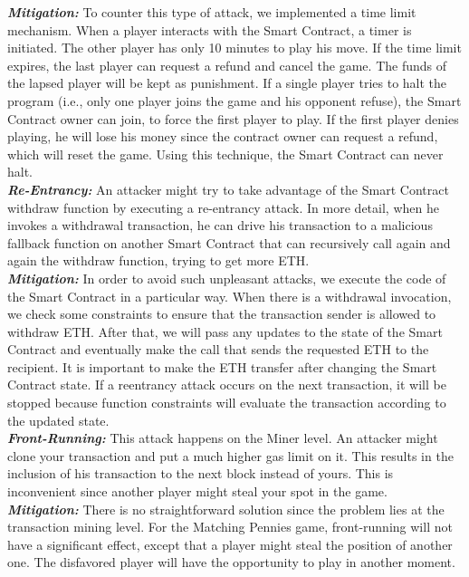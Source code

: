\documentclass[12pt,a4paper]{article}
\begin{document}
\textbf{\emph{Mitigation: }}To counter this type of attack, we implemented a
time limit mechanism. When a player interacts with the Smart Contract, a timer
is initiated. The other player has only 10 minutes to play his move. If the time
limit expires, the last player can request a refund and cancel the game. The
funds of the lapsed player will be kept as punishment. If a single player tries
to halt the program (i.e., only one player joins the game and his opponent
refuse), the Smart Contract owner can join, to force the first player to play.
If the first player denies playing, he will lose his money since the contract
owner can request a refund, which will reset the game. Using this technique, the
Smart Contract can never halt.\\

\textbf{\emph{Re-Entrancy: }}An attacker might try to take advantage of the
Smart Contract withdraw function by executing a re-entrancy attack. In more
detail, when he invokes a withdrawal transaction, he can drive his transaction
to a malicious fallback function on another Smart Contract that can recursively
call again and again the withdraw function, trying to get more ETH.\\

\textbf{\emph{Mitigation: }}In order to avoid such unpleasant attacks, we
execute the code of the Smart Contract in a particular way. When there is a
withdrawal invocation, we check some constraints to ensure that the transaction
sender is allowed to withdraw ETH. After that, we will pass any updates to the
state of the Smart Contract and eventually make the call that sends the
requested ETH to the recipient. It is important to make the ETH transfer after
changing the Smart Contract state. If a reentrancy attack occurs on the next
transaction, it will be stopped because function constraints will evaluate the
transaction according to the updated state.\\

\textbf{\emph{Front-Running: }}This attack happens on the Miner level. An
attacker might clone your transaction and put a much higher gas limit on it.
This results in the inclusion of his transaction to the next block instead of
yours. This is inconvenient since another player might steal your spot in the
game. \\

\textbf{\emph{Mitigation: }}There is no straightforward solution since the
problem lies at the transaction mining level. For the Matching Pennies game,
front-running will not have a significant effect, except that a player might
steal the position of another one. The disfavored player will have the
opportunity to play in another moment. \\
\end{document}
